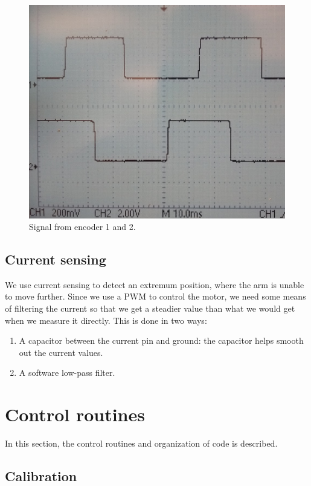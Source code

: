 \documentclass[10pt,a4paper]{article}
\begin{document}
\begin{figure}[H]
    \centering
    \includegraphics[scale=0.3]{encoderSignal.jpg}
    \caption{Signal from encoder 1 and 2.}
    \label{fig:encoderSignal}
\end{figure}

\subsection{Current sensing}
We use current sensing to detect an extremum position, where the arm
is unable to move further. Since we use a PWM to control the motor, we
need some means of filtering the current so that we get a steadier
value than what we would get when we measure it directly. This is done
in two ways: 
\begin{enumerate}
\item A capacitor between the current pin and ground: the capacitor
  helps smooth out the current values.
\item A software low-pass filter.
\end{enumerate}

\section{Control routines}

In this section, the control routines and organization of code is
described.

\subsection{Calibration}
\end{document}
